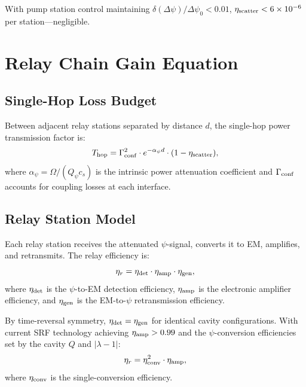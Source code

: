 \documentclass[twocolumn,superscriptaddress,prd]{revtex4-2}
\begin{document}
With pump station control maintaining $\delta(\Delta\psi)/\Delta\psi_0 < 0.01$,
$\eta_{\rm scatter} < 6 \times 10^{-6}$ per station---negligible.

\section{Relay Chain Gain Equation}
\label{sec:relay}

\subsection{Single-Hop Loss Budget}

Between adjacent relay stations separated by distance $d$, the
single-hop power transmission factor is:
\begin{equation}
T_{\rm hop} = \Gamma_{\rm conf}^2 \cdot e^{-\alpha_\psi d} \cdot (1 - \eta_{\rm scatter}),
\label{eq:single-hop}
\end{equation}
where $\alpha_\psi = \Omega/(Q_\psi c_s)$ is the intrinsic power
attenuation coefficient and $\Gamma_{\rm conf}$ accounts for
coupling losses at each interface.

\subsection{Relay Station Model}

Each relay station receives the attenuated $\psi$-signal,
converts it to EM, amplifies, and retransmits.  The relay
efficiency is:
\begin{equation}
\eta_r = \eta_{\rm det} \cdot \eta_{\rm amp} \cdot \eta_{\rm gen},
\label{eq:relay-eff}
\end{equation}
where $\eta_{\rm det}$ is the $\psi$-to-EM detection efficiency,
$\eta_{\rm amp}$ is the electronic amplifier efficiency, and
$\eta_{\rm gen}$ is the EM-to-$\psi$ retransmission efficiency.

By time-reversal symmetry, $\eta_{\rm det} = \eta_{\rm gen}$ for
identical cavity configurations.  With current SRF technology
achieving $\eta_{\rm amp} > 0.99$ and the $\psi$-conversion
efficiencies set by the cavity $Q$ and $|\lambda - 1|$:
\begin{equation}
\eta_r = \eta_{\rm conv}^2 \cdot \eta_{\rm amp},
\end{equation}
where $\eta_{\rm conv}$ is the single-conversion efficiency.
\end{document}

